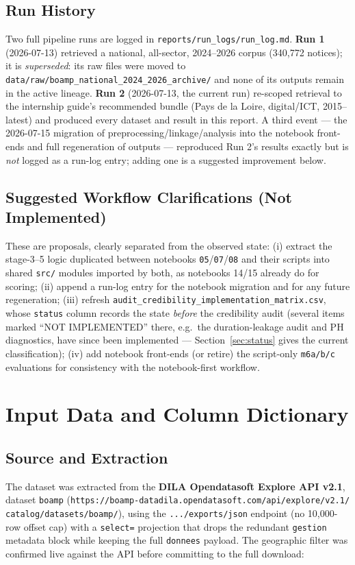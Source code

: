 \documentclass[11pt]{article}
\begin{document}
\subsection{Run History}
Two full pipeline runs are logged in
\texttt{reports/run\_logs/run\_log.md}. \textbf{Run 1} (2026-07-13)
retrieved a national, all-sector, 2024--2026 corpus (340{,}772 notices);
it is \emph{superseded}: its raw files were moved to
\texttt{data/raw/boamp\_national\_2024\_2026\_archive/} and none of its
outputs remain in the active lineage. \textbf{Run 2} (2026-07-13, the
current run) re-scoped retrieval to the internship guide's recommended
bundle (Pays de la Loire, digital/ICT, 2015--latest) and produced every
dataset and result in this report. A third event --- the 2026-07-15
migration of preprocessing/linkage/analysis into the notebook front-ends
and full regeneration of outputs --- reproduced Run 2's results exactly but
is \emph{not} logged as a run-log entry; adding one is a suggested
improvement below.

\subsection{Suggested Workflow Clarifications (Not Implemented)}
These are proposals, clearly separated from the observed state: (i) extract
the stage-3--5 logic duplicated between notebooks
\texttt{05}/\texttt{07}/\texttt{08} and their scripts into shared
\texttt{src/} modules imported by both, as notebooks 14/15 already do for
scoring; (ii) append a run-log entry for the notebook migration and for any
future regeneration; (iii) refresh
\texttt{audit\_credibility\_implementation\_matrix.csv}, whose
\texttt{status} column records the state \emph{before} the credibility
audit (several items marked ``NOT IMPLEMENTED'' there, e.g.\ the
duration-leakage audit and PH diagnostics, have since been implemented ---
Section~\ref{sec:status} gives the current classification); (iv) add
notebook front-ends (or retire) the script-only \texttt{m6a/b/c}
evaluations for consistency with the notebook-first workflow.

\section{Input Data and Column Dictionary}
\label{sec:data}

\subsection{Source and Extraction}
The dataset was extracted from the \textbf{DILA Opendatasoft Explore API
v2.1}, dataset \texttt{boamp}
(\texttt{https://boamp-datadila.opendatasoft.com/api/explore/v2.1/\allowbreak
catalog/datasets/boamp/}), using the \texttt{.../exports/json} endpoint
(no 10{,}000-row offset cap) with a \texttt{select=} projection that drops
the redundant \texttt{gestion} metadata block while keeping the full
\texttt{donnees} payload. The geographic filter was confirmed live against
the API before committing to the full download:
\end{document}
